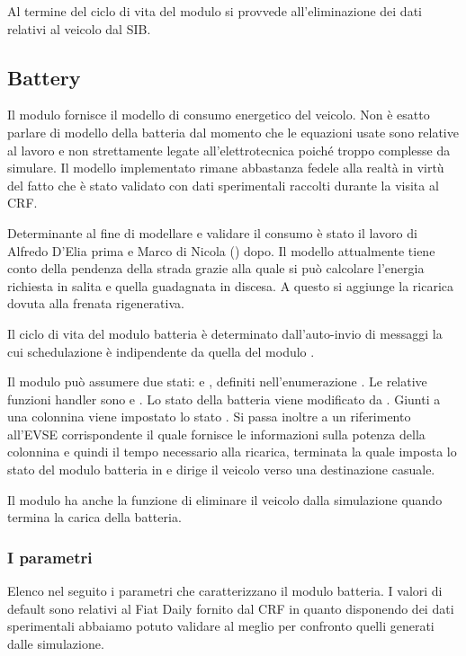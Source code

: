 Al termine del ciclo di vita del modulo si provvede all'eliminazione dei dati relativi al veicolo dal SIB.

\subsection{Battery}\label{sec:battery}

Il modulo fornisce il modello di consumo energetico del veicolo. Non è esatto parlare di modello della batteria dal momento che le equazioni usate sono relative al lavoro e non strettamente legate all'elettrotecnica poiché troppo complesse da simulare. Il modello implementato rimane abbastanza fedele alla realtà in virtù del fatto che è stato validato con dati sperimentali raccolti durante la visita al CRF.

Determinante al fine di modellare e validare il consumo è stato il lavoro di Alfredo D'Elia prima e Marco di Nicola (\cite{dinicola2014}) dopo. Il modello attualmente tiene conto della pendenza della strada grazie alla quale si può calcolare l'energia richiesta in salita e quella guadagnata in discesa. A questo si aggiunge la ricarica dovuta alla frenata rigenerativa.

Il ciclo di vita del modulo batteria è determinato dall'auto-invio di messaggi la cui schedulazione è indipendente da quella del modulo .

Il modulo  può assumere due stati:  e , definiti nell'enumerazione . Le relative funzioni handler sono  e . Lo stato della batteria viene modificato da . Giunti a una colonnina viene impostato lo stato . Si passa inoltre a  un riferimento all'EVSE corrispondente il quale fornisce le informazioni sulla potenza della colonnina e quindi il tempo necessario alla ricarica, terminata la quale  imposta lo stato del modulo batteria in  e dirige il veicolo verso una destinazione casuale.

Il modulo  ha anche la funzione di eliminare il veicolo dalla simulazione quando termina la carica della batteria.

\subsubsection{I parametri}

Elenco nel seguito i parametri che caratterizzano il modulo batteria. I valori di default sono relativi al Fiat Daily fornito dal CRF in quanto disponendo dei dati sperimentali abbaiamo potuto validare al meglio per confronto quelli generati dalle simulazione.

